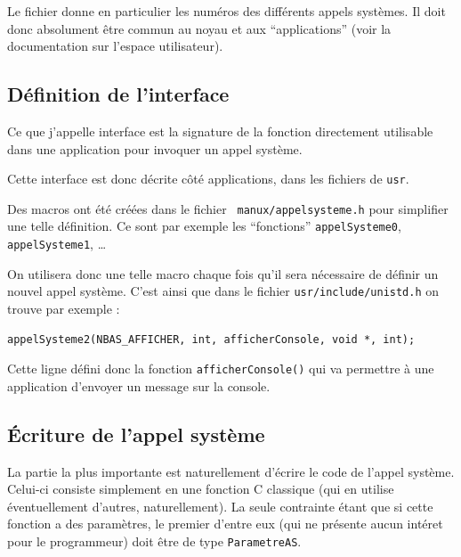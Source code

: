    Le fichier  donne en particulier les
numéros des différents appels systèmes. Il doit donc absolument être
commun au noyau et aux ``applications'' (voir la documentation sur
l'espace utilisateur).

\subsection{Définition de l'interface}

   Ce que j'appelle interface est la signature de la fonction
directement utilisable dans une application pour invoquer un appel
système.

   Cette interface est donc décrite côté applications, dans les
fichiers de {\tt usr}.
   
   Des macros ont été créées dans le fichier {\tt
manux/appelsysteme.h} pour simplifier une telle définition. Ce
sont par exemple les ``fonctions'' \lstinline!appelSysteme0!,
\lstinline!appelSysteme1!, \ldots 

   On utilisera donc une telle macro chaque fois qu'il sera nécessaire
de définir un nouvel appel système. C'est ainsi que dans le fichier
\lstinline!usr/include/unistd.h! on trouve par exemple :

\begin{lstlisting}
appelSysteme2(NBAS_AFFICHER, int, afficherConsole, void *, int);
\end{lstlisting}

   Cette ligne défini donc la fonction \lstinline!afficherConsole()!
qui va permettre à une application d'envoyer un message sur la console.

\subsection{Écriture de l'appel système}

   La partie la plus importante est naturellement d'écrire le code de
l'appel système. Celui-ci consiste simplement en une fonction C
classique (qui en utilise éventuellement d'autres, naturellement). La
seule contrainte étant que si cette fonction a des paramètres, le
premier d'entre eux (qui ne présente aucun intéret pour le
programmeur) doit être de type \lstinline!ParametreAS!.


